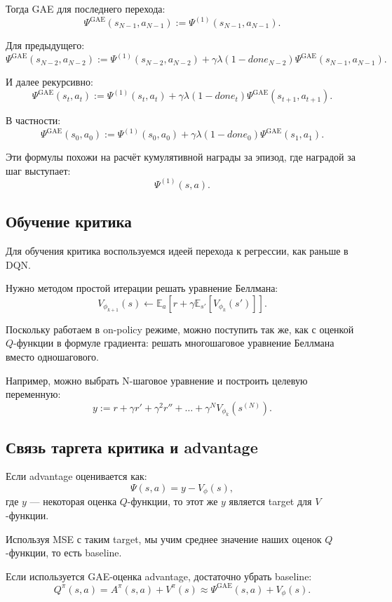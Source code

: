 \documentclass[12pt,a4paper]{article}
\begin{document}
Тогда GAE для последнего перехода:
\[
\Psi^{\mathrm{GAE}}(s_{N-1},a_{N-1})
:=
\Psi^{(1)}(s_{N-1},a_{N-1}).
\]

Для предыдущего:
\[
\Psi^{\mathrm{GAE}}(s_{N-2},a_{N-2})
:=
\Psi^{(1)}(s_{N-2},a_{N-2})
+
\gamma\lambda(1-done_{N-2})
\Psi^{\mathrm{GAE}}(s_{N-1},a_{N-1}).
\]

И далее рекурсивно:
\[
\Psi^{\mathrm{GAE}}(s_t,a_t)
:=
\Psi^{(1)}(s_t,a_t)
+
\gamma\lambda(1-done_t)
\Psi^{\mathrm{GAE}}(s_{t+1},a_{t+1}).
\]

В частности:
\[
\Psi^{\mathrm{GAE}}(s_0,a_0)
:=
\Psi^{(1)}(s_0,a_0)
+
\gamma\lambda(1-done_0)
\Psi^{\mathrm{GAE}}(s_1,a_1).
\]

Эти формулы похожи на расчёт кумулятивной награды за эпизод, где наградой за шаг выступает:
\[
\Psi^{(1)}(s,a).
\]

\subsection{Обучение критика}

Для обучения критика воспользуемся идеей перехода к регрессии, как раньше в DQN.

Нужно методом простой итерации решать уравнение Беллмана:
\[
V_{\phi_{k+1}}(s)
\leftarrow
\mathbb E_a
\left[
r
+
\gamma
\mathbb E_{s'}
\left[
V_{\phi_k}(s')
\right]
\right].
\]

Поскольку работаем в on-policy режиме, можно поступить так же, как с оценкой $Q$-функции в формуле градиента: решать многошаговое уравнение Беллмана вместо одношагового.

Например, можно выбрать N-шаговое уравнение и построить целевую переменную:
\[
y
:=
r
+
\gamma r'
+
\gamma^2 r''
+
\ldots
+
\gamma^N
V_{\phi_k}(s^{(N)}).
\]

\subsection{Связь таргета критика и advantage}

Если advantage оценивается как:
\[
\Psi(s,a)
=
y
-
V_\phi(s),
\]
где $y$ --- некоторая оценка $Q$-функции, то этот же $y$ является target для $V$-функции.

Используя MSE с таким target, мы учим среднее значение наших оценок $Q$-функции, то есть baseline.

Если используется GAE-оценка advantage, достаточно убрать baseline:
\[
Q^\pi(s,a)
=
A^\pi(s,a)
+
V^\pi(s)
\approx
\Psi^{\mathrm{GAE}}(s,a)
+
V_\phi(s).
\]
\end{document}
